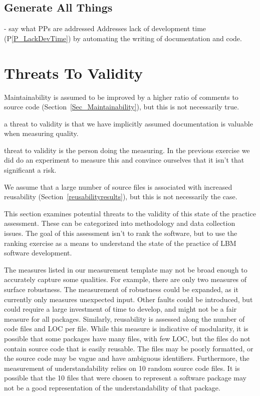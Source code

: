 \documentclass[final, 3p, times, authoryear]{elsarticle}
\newcommand{\ppref}[1]{P\ref{#1}}
\begin{document}
\subsection{Generate All Things}

- say what PPs are addressed Addresses lack of development time
(\ppref{P_LackDevTime}) by automating the writing of documentation and code.

\section{Threats To Validity} \label{threats}

Maintainability is assumed to be improved by a higher ratio of comments to
source code (Section~\ref{Sec_Maintainability}), but this is not necessarily
true.

a threat to validity is that we have implicitly assumed documentation is
valuable when measuring quality.

threat to validity is the person doing the measuring.  In the previous exercise
we did do an experiment to measure this and convince ourselves that it isn't
that significant a risk.

We assume that a large number of source files is associated with increased
reusability (Section~\ref{reusabilityresults}), but this is not necessarily the
case.

This section examines potential threats to the validity of this state of the
practice assessment. These can be categorized into methodology and data
collection issues. The goal of this assessment isn't to rank the software, but
to use the ranking exercise as a means to understand the state of the practice
of LBM software development.

The measures listed in our measurement template may not be broad enough to
accurately capture some qualities. For example, there are only two measures of
surface robustness. The measurement of robustness could be expanded, as it
currently only measures unexpected input. Other faults could be introduced, but
could require a large investment of time to develop, and might not be a fair
measure for all packages. Similarly, reusability is assessed along the number of
code files and LOC per file. While this measure is indicative of modularity, it
is possible that some packages have many files, with few LOC, but the files do
not contain source code that is easily reusable. The files may be poorly
formatted, or the source code may be vague and have ambiguous identifiers.
Furthermore, the measurement of understandability relies on 10 random source
code files. It is possible that the 10 files that were chosen to represent a
software package may not be a good representation of the understandability of
that package.
\end{document}
